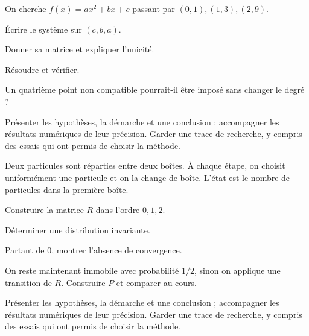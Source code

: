 \label{projet-7}
On cherche $f(x)=ax^2+bx+c$ passant par $(0,1),(1,3),(2,9)$.
\begin{questions}
\item Écrire le système sur $(c,b,a)$.
\item Donner sa matrice et expliquer l’unicité.
\item Résoudre et vérifier.
\item Un quatrième point non compatible pourrait-il être imposé sans changer le degré ?
\end{questions}
\vspace{5mm}\noindent Présenter les hypothèses, la démarche et une conclusion ; accompagner les résultats numériques de leur précision. Garder une trace de recherche, y compris des essais qui ont permis de choisir la méthode.\par\vfill{}\par\vspace{2mm}\noindent{}
\label{projet-8}
Deux particules sont réparties entre deux boîtes. À chaque étape, on choisit uniformément une particule et on la change de boîte. L’état est le nombre de particules dans la première boîte.
\begin{questions}
\item Construire la matrice $R$ dans l’ordre $0,1,2$.
\item Déterminer une distribution invariante.
\item Partant de $0$, montrer l’absence de convergence.
\item On reste maintenant immobile avec probabilité $1/2$, sinon on applique une transition de $R$. Construire $P$ et comparer au cours.
\end{questions}
\vspace{5mm}\noindent Présenter les hypothèses, la démarche et une conclusion ; accompagner les résultats numériques de leur précision. Garder une trace de recherche, y compris des essais qui ont permis de choisir la méthode.\par\vfill{}\par\vspace{2mm}\noindent{}
